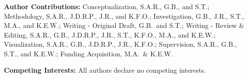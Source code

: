 \documentclass[12pt]{article}
\begin{document}
{\bf Author Contributions:} 
Conceptualization, S.A.R., G.B., and S.T.; Methodology, S.A.R., J.D.R.P., J.R., and K.F.O.; Investigation, G.B., J.R., S.T., M.A., and K.E.W.; Writing - Original Draft, G.B.\ and S.T.; Writing - Review \& Editing, S.A.R., G.B., J.D.R.P., J.R., S.T., K.F.O., M.A., and K.E.W.; Visualization, S.A.R., G.B., J.D.R.P., J.R., K.F.O.; Supervision, S.A.R., G.B., S.T., and K.E.W.; Funding Acquisition, M.A.\ \& K.E.W.

{\bf Competing Interests:} All authors declare no competing interests.
\end{document}
